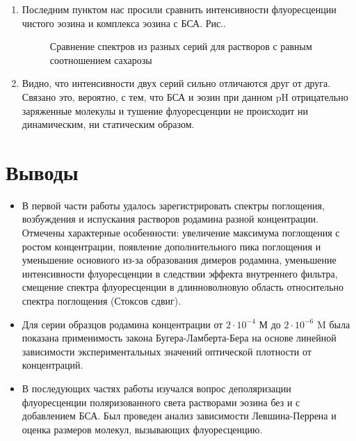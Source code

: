 \documentclass{article}
\begin{document}
\begin{enumerate}
    \item Последним пунктом нас просили сравнить интенсивности флуоресценции чистого эозина и комплекса эозина с БСА. Рис..
    \begin{figure}[h!]
    \caption{Сравнение спектров из разных серий для растворов с равным соотношением сахарозы}
    \end{figure}
    \item Видно, что интенсивности двух серий сильно отличаются друг от друга. Связано это, вероятно, с тем, что БСА и эозин при данном pH отрицательно заряженные молекулы и тушение флуоресценции не происходит ни динамическим, ни статическим образом.  
\end{enumerate}
    \section{Выводы}
    \begin{itemize}
        \item В первой части работы удалось зарегистрировать спектры поглощения, возбуждения и испускания растворов родамина разной концентрации. Отмечены характерные особенности: увеличение максимума поглощения с ростом концентрации, появление дополнительного пика поглощения и уменьшение основного из-за образования димеров родамина, уменьшение интенсивности флуоресценции в следствии эффекта внутреннего фильтра, смещение спектра флуоресценции в длинноволновую область относительно спектра поглощения (Стоксов сдвиг).
        \item Для серии образцов родамина концентрации от $2 \cdot 10^{-4}$ М до $2 \cdot 10^{-6}$ M была показана применимость закона Бугера-Ламберта-Бера на основе линейной зависимости экспериментальных значений оптической плотности от концентраций.
        \item В последующих частях работы изучался вопрос деполяризации флуоресценции поляризованного света растворами эозина без и с добавлением БСА. Был проведен анализ зависимости Левшина-Перрена и оценка размеров молекул, вызывающих флуоресценцию.
    \end{itemize}
\end{document}
